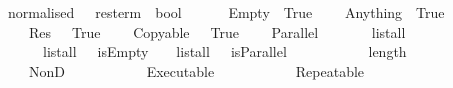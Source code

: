 \isamarkupfalse%
\ normalised\ {\isacharcolon}{\isacharcolon}\ {\isachardoublequoteopen}\ res{\isacharunderscore}term\ {\isasymRightarrow}\ bool{\isachardoublequoteclose}\ \isanewline
\ \ \ \ {\isachardoublequoteopen}\ Empty\ {\isacharequal}\ True{\isachardoublequoteclose}\isanewline
\ \ {\isacharbar}\ {\isachardoublequoteopen}\ Anything\ {\isacharequal}\ True{\isachardoublequoteclose}\isanewline
\ \ {\isacharbar}\ {\isachardoublequoteopen}\ {\isacharparenleft}Res\ \ {\isacharequal}\ True{\isachardoublequoteclose}\isanewline
\ \ {\isacharbar}\ {\isachardoublequoteopen}\ {\isacharparenleft}Copyable\ \ {\isacharequal}\ True{\isachardoublequoteclose}\isanewline
\ \ {\isacharbar}\ {\isachardoublequoteopen}\ {\isacharparenleft}Parallel\ \ {\isacharequal}\isanewline
\ \ \ \ {\isacharparenleft}\ list{\isacharunderscore}all\ \ \ {\isasymand}\isanewline
\ \ \ \ \ \ list{\isacharunderscore}all\ {\isacharparenleft}{\isasymlambda}\ {\isasymnot}\ is{\isacharunderscore}Empty\ \ \ {\isasymand}\ list{\isacharunderscore}all\ {\isacharparenleft}{\isasymlambda}\ {\isasymnot}\ is{\isacharunderscore}Parallel\ \ \ {\isasymand}\isanewline
\ \ \ \ \ \ {}\ {\isacharless}\ length\ \isanewline
\ \ {\isacharbar}\ {\isachardoublequoteopen}\ {\isacharparenleft}NonD\ \ {\isacharequal}\ {\isacharparenleft}\ \ {\isasymand}\ \ \isanewline
\ \ {\isacharbar}\ {\isachardoublequoteopen}\ {\isacharparenleft}Executable\ \ {\isacharequal}\ {\isacharparenleft}\ \ {\isasymand}\ \ \isanewline
\ \ {\isacharbar}\ {\isachardoublequoteopen}\ {\isacharparenleft}Repeatable\ \ {\isacharequal}\ {\isacharparenleft}\ \ {\isasymand}\ \ 
